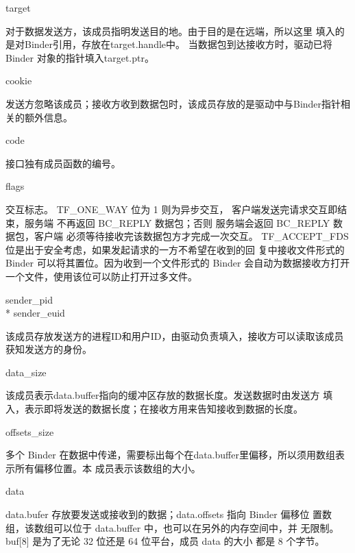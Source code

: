 \documentclass[a4paper,11pt]{article}
\begin{document}
\begin{itemize*}
    \item  target

        对于数据发送方，该成员指明发送目的地。由于目的是在远端，所以这里
        填入的是对Binder引用，存放在target.handle中。
        当数据包到达接收方时，驱动已将 Binder 对象的指针填入target.ptr。
        
    \item cookie

        发送方忽略该成员；接收方收到数据包时，该成员存放的是驱动中与Binder指针相关的额外信息。

    \item code

        接口独有成员函数的编号。

    \item flags\label{BinderInteractionFlag} 

          交互标志。
           TF_ONE_WAY 位为 1 则为异步交互， 客户端发送完请求交互即结束，服务端
           不再返回 BC_REPLY 数据包；否则 服务端会返回 BC_REPLY 数据包，客户端
           必须等待接收完该数据包方才完成一次交互。
           TF_ACCEPT_FDS 位是出于安全考虑，如果发起请求的一方不希望在收到的回
           复中接收文件形式的 Binder 可以将其置位。因为收到一个文件形式的
           Binder 会自动为数据接收方打开一个文件，使用该位可以防止打开过多文件。

      \item sender_pid\\* sender_euid

          该成员存放发送方的进程ID和用户ID，由驱动负责填入，接收方可以读取该成员获知发送方的身份。

      \item data_size

          该成员表示data.buffer指向的缓冲区存放的数据长度。发送数据时由发送方
          填入，表示即将发送的数据长度；在接收方用来告知接收到数据的长度。

      \item offsets_size

          多个 Binder 在数据中传递，需要标出每个在data.buffer里偏移，所以须用数组表示所有偏移位置。本
          成员表示该数组的大小。

      \item data 

          data.bufer 存放要发送或接收到的数据；data.offsets 指向 Binder 偏移位
          置数组，该数组可以位于 data.buffer 中，也可以在另外的内存空间中，并
          无限制。buf[8] 是为了无论 32 位还是 64 位平台，成员 data 的大小
          都是 8 个字节。

\end{itemize*}
\end{document}
